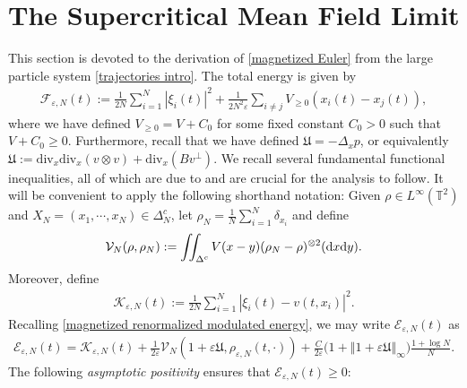 \documentclass[11pt,reqno]{amsart}
\numberwithin{equation}{section}
\def\dd{{\rm d}}
\begin{document}
\section{The Supercritical Mean Field Limit}\label{sec mean field}
This section is devoted to the derivation of \eqref{magnetized Euler} from the large particle 
system \eqref{trajectories intro}. The total energy is given by 
\begin{align}
\mathcal{F}_{\varepsilon,N}(t):=\frac{1}{2N}\sum_{i=1}^{N}\left\vert \xi_{i}(t)\right\vert^{2}+\frac{1}{2N^{2}\varepsilon}\sum_{i\neq j}V_{\geq 0}(x_{i}(t)-x_{j}(t)),\label{total energy discrete}     
\end{align}
where we have defined $V_{\geq 0}=V+C_{0}$ for some fixed constant $C_{0}>0$ such that $V+C_{0}\geq 0$.  
Furthermore, recall that we have defined $\mathfrak{U}=-\Delta_{x}p$, or equivalently $\mathfrak{U}:= \mathrm{div}_{x}\mathrm{div}_{x}(v\otimes v)+\mathrm{div}_{x}(Bv^{\perp})$. 
We recall several fundamental functional inequalities, all of which are due to \cite{duerinckx2020mean} and are crucial for the analysis to follow. 
It will be convenient to apply the following shorthand notation: 
Given $\rho\in L^{\infty}(\mathbb{T}^{2})$ and  $X_{N}=(x_{1},\cdots\!,x_{N})\in \Delta_{N}^{c}$, 
let $\rho_{N}=\frac{1}{N}\sum_{i=1}^{N}\delta_{x_{i}}$ and define 
\begin{align*}
\mathcal{V}_{N}(\rho,\rho_{N}):=\iint_{\Delta^{c}}V(x-y)(\rho_{N}-\rho)^{\otimes 2}(\dd x\dd y).      
\end{align*}
Moreover, define 
\begin{align*}
\mathcal{K}_{\varepsilon,N}(t)
:= \frac{1}{2N}\sum_{i=1}^{N}\left\vert \xi_{i}(t)-v(t,x_{i})\right\vert^{2}.     
\end{align*}
Recalling \eqref{magnetized renormalized modulated energy},   
we may write $\mathcal{E}_{\varepsilon,N}(t)$ as 
\begin{align*}
\mathcal{E}_{\varepsilon,N}(t)=\mathcal{K}_{\varepsilon,N}(t)+\frac{1}{2\varepsilon}\mathcal{V}_{N}(1+\varepsilon\mathfrak{U},\rho_{\varepsilon,N}(t,\cdot))
+\frac{C}{2\varepsilon}\big(1+\left\Vert 1+\varepsilon \mathfrak{U}\right\Vert_{\infty}\big)\frac{1+\log N}{N}.     
\end{align*}  
The following {\it asymptotic positivity} ensures that $\mathcal{E}_{\varepsilon,N}(t)\geq 0$:
\end{document}
